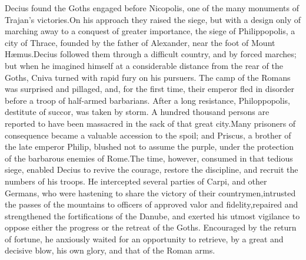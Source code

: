 Decius found the Goths engaged before Nicopolis, one of the many
monuments of Trajan’s victories.\footnotemark[30] On his approach they raised
the siege, but with a design only of marching away to a conquest
of greater importance, the siege of Philippopolis, a city of
Thrace, founded by the father of Alexander, near the foot of
Mount Hæmus.\footnotemark[31] Decius followed them through a difficult country,
and by forced marches; but when he imagined himself at a
considerable distance from the rear of the Goths, Cniva turned
with rapid fury on his pursuers. The camp of the Romans was
surprised and pillaged, and, for the first time, their emperor
fled in disorder before a troop of half-armed barbarians. After a
long resistance, Philoppopolis, destitute of succor, was taken by
storm. A hundred thousand persons are reported to have been
massacred in the sack of that great city.\footnotemark[32] Many prisoners of
consequence became a valuable accession to the spoil; and
Priscus, a brother of the late emperor Philip, blushed not to
assume the purple, under the protection of the barbarous enemies
of Rome.\footnotemark[33] The time, however, consumed in that tedious siege,
enabled Decius to revive the courage, restore the discipline, and
recruit the numbers of his troops. He intercepted several parties
of Carpi, and other Germans, who were hastening to share the
victory of their countrymen,\footnotemark[34] intrusted the passes of the
mountains to officers of approved valor and fidelity,\footnotemark[35] repaired
and strengthened the fortifications of the Danube, and exerted
his utmost vigilance to oppose either the progress or the retreat
of the Goths. Encouraged by the return of fortune, he anxiously
waited for an opportunity to retrieve, by a great and decisive
blow, his own glory, and that of the Roman arms.\footnotemark[36]





